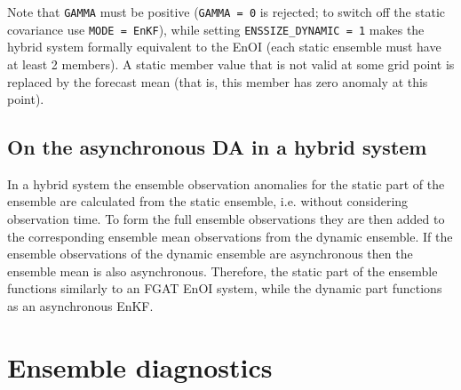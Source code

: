 \documentclass[11pt]{report}
\begin{document}
Note that \verb|GAMMA| must be positive (\verb|GAMMA = 0| is rejected; to switch off the static covariance use \verb|MODE = EnKF|), while setting \verb|ENSSIZE_DYNAMIC = 1| makes the hybrid system formally equivalent to the EnOI (each static ensemble must have at least 2 members).
A static member value that is not valid at some grid point is replaced by the forecast mean (that is, this member has zero anomaly at this point).

\subsection{On the asynchronous DA in a hybrid system}

In a hybrid system the ensemble observation anomalies for the static part of the ensemble are calculated from the static ensemble, i.e. without considering observation time.
To form the full ensemble observations they are then added to the corresponding ensemble mean observations from the dynamic ensemble.
If the ensemble observations of the dynamic ensemble are asynchronous then the ensemble mean is also asynchronous.
Therefore, the static part of the ensemble functions similarly to an FGAT EnOI system, while the dynamic part functions as an asynchronous EnKF.

\section{Ensemble diagnostics}
\label{sec:diag}
\end{document}
